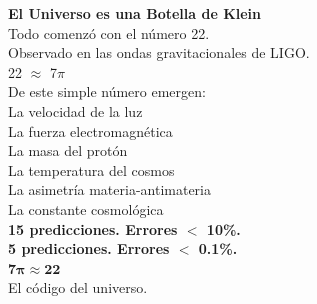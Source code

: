 \documentclass[12pt, a4paper, twoside]{book}
\begin{document}
\tableofcontents
\newpage
















\appendix



\newpage
\thispagestyle{empty}
\vspace*{\fill}
\begin{center}
\begin{tcolorbox}[colback=white, colframe=kleinblue, width=0.9\textwidth, boxrule=3pt]
\centering
{\Large\bfseries El Universo es una Botella de Klein}\\[1cm]

Todo comenzó con el número 22.\\
Observado en las ondas gravitacionales de LIGO.\\[0.5cm]

22 $\approx$ 7$\pi$\\[0.5cm]

De este simple número emergen:\\[0.3cm]
La velocidad de la luz\\
La fuerza electromagnética\\
La masa del protón\\
La temperatura del cosmos\\
La asimetría materia-antimateria\\
La constante cosmológica\\[0.5cm]

\textbf{15 predicciones. Errores $<$ 10\%.}\\
\textbf{5 predicciones. Errores $<$ 0.1\%.}\\[1cm]

{\Large $\boldsymbol{7\pi \approx 22}$}\\[0.5cm]

El código del universo.
\end{tcolorbox}
\end{center}
\vspace*{\fill}
\end{document}
